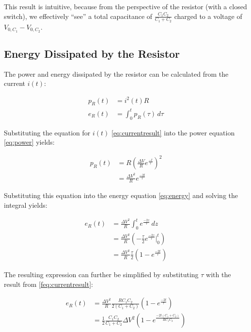 This result is intuitive, because from the perspective of the resistor (with a
closed   switch),   we   effectively   ``see''   a   total    capacitance   of
$\frac{C_1C_2}{C_1+C_2}$  charged  to  a voltage of $V_{0,C_1}  -  V_{0,C_2}$.

\subsection{Energy Dissipated by the Resistor}

The power and  energy  dissipated  by  the resistor can be calculated from the
current $i(t)$:

\begin{align}
    p_R(t) &= i^2(t) R \label{eq:power} \\
    e_R(t) &= \int_0^t p_R(\tau)\,d\tau \label{eq:energy}
\end{align}

Substituting  the equation for $i(t)$ \ref{eq:currentresult}  into  the  power
equation \ref{eq:power} yields:

\begin{align}
    p_R(t) &= R\left(\frac{\Delta V}{R} e^{\frac{-t}{\tau}}\right)^2 \\
           &= \frac{{\Delta V}^2}{R} e^{\frac{-2t}{\tau}}
\end{align}

Substituting  this  equation  into the  energy  equation  \ref{eq:energy}  and
solving the integral yields:

\begin{align}
    e_R(t) &= \frac{{\Delta V}^2}{R} \int_0^t e^{\frac{-2z}{\tau}}\,dz \\
           &= \frac{{\Delta V}^2}{R} \left(-\frac{\tau}{2} e^{\frac{-2z}{\tau}} \bigg|_0^t\right) \\
           &= \frac{{\Delta V}^2}{R} \frac{\tau}{2}\left(1 - e^{\frac{-2t}{\tau}}\right)
\end{align}

The resulting expression can further be simplified by substituting $\tau$ with
the result from \ref{feq:currentresult}:

\begin{align}
    e_R(t) &= \frac{{\Delta V}^2}{R} \frac{RC_1C_2}{2\left(C_1+C_2\right)}\left(1 - e^{\frac{-2t}{\tau}}\right) \\
           &= \frac{1}{2} \frac{C_1C_2}{C_1+C_2} {\Delta V}^2 \left(1 - e^{\frac{-2t\left(C_1+C_2\right)}{RC_1C_2}}\right)
\end{align}


